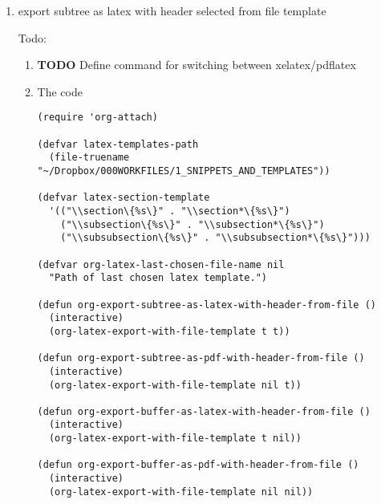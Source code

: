 \documentclass[nofonts]{tufte-handout}
\begin{document}
\begin{enumerate}
\item export subtree as latex with header selected from file template
\label{sec-2-5-11-1}

Todo:

\begin{enumerate}
\item {\bfseries\sffamily TODO} Define command for switching between xelatex/pdflatex
\label{sec-2-5-11-1-1}

\item The code
\label{sec-2-5-11-1-2}


\begin{verbatim}
(require 'org-attach)

(defvar latex-templates-path
  (file-truename "~/Dropbox/000WORKFILES/1_SNIPPETS_AND_TEMPLATES"))

(defvar latex-section-template
  '(("\\section\{%s\}" . "\\section*\{%s\}")
    ("\\subsection\{%s\}" . "\\subsection*\{%s\}")
    ("\\subsubsection\{%s\}" . "\\subsubsection*\{%s\}")))

(defvar org-latex-last-chosen-file-name nil
  "Path of last chosen latex template.")

(defun org-export-subtree-as-latex-with-header-from-file ()
  (interactive)
  (org-latex-export-with-file-template t t))

(defun org-export-subtree-as-pdf-with-header-from-file ()
  (interactive)
  (org-latex-export-with-file-template nil t))

(defun org-export-buffer-as-latex-with-header-from-file ()
  (interactive)
  (org-latex-export-with-file-template t nil))

(defun org-export-buffer-as-pdf-with-header-from-file ()
  (interactive)
  (org-latex-export-with-file-template nil nil))


\end{verbatim}
\end{enumerate}
\end{enumerate}
\end{document}
